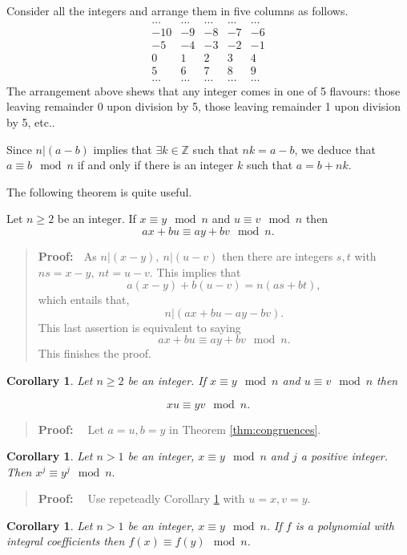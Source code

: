 \documentclass[11pt, openany]{book}
\theoremstyle{change} \theoremheaderfont{\blue\sffamily\bfseries}
\newtheorem{cor}[thm]{Corollary}
\newcommand{\proofsymbol}{\Pisymbol{pzd}{113}}
\theoremstyle{nonumberplain} \theoremheaderfont{\sffamily\bfseries}
\newenvironment{pf}[0]{\itshape\begin{quote}{\bf Proof: \ }}{\proofsymbol\end{quote}}
\newcommand{\BBZ}{\mathbb{Z}}
\newcommand{\í}{\'{\i}}
\begin{document}
Consider all the integers and arrange them in five columns as
follows.
$$\begin{array}{ccccc}
\ldots & \ldots & \ldots & \ldots & \ldots \\
-10 & -9 & -8 & -7 & -6 \\
-5 & -4 & -3 & -2 & -1 \\
0 & 1 & 2 & 3 & 4 \\
5 & 6 & 7 & 8 & 9 \\
\ldots & \ldots & \ldots & \ldots & \ldots
\end{array}$$
The arrangement above shews that any integer comes in one of 5
flavours: those leaving remainder 0 upon division by 5, those
leaving remainder 1 upon division by 5, etc..





Since $n|(a - b)$ implies that $\exists k \in \BBZ$ such that $nk
= a - b$, we deduce that $a \equiv b \mod n$ if and only if there
is an integer $k$ such that $a = b + nk.$



The following theorem is quite useful.
\begin{thm} Let $n \geq 2$  be an integer. If $x \equiv y  \mod n$ and
$u \equiv v \mod n$ then
$$ax + bu \equiv ay + bv \mod n.$$
\label{thm:congruences}\end{thm}
\begin{pf}As $n|(x - y), \ n|(u - v)$ then there are integers $s, t$
with $ns = x - y, \ nt = u - v$. This implies that
$$a(x - y) + b(u - v) = n(as + bt),$$ which entails that,
$$n|(ax + bu - ay - bv).$$This last assertion is equivalent to saying
$$ax + bu \equiv ay + bv  \mod n.$$ This finishes the proof.
\end{pf}
\begin{cor} Let $n \geq 2$  be an integer. If $x \equiv y \mod n$ and
$u \equiv v \mod n$ then

$$xu \equiv  yv \mod n.$$
\label{cor:cong_1}\end{cor}
\begin{pf} Let $a = u, b = y$ in Theorem \ref{thm:congruences}.
\end{pf}
\begin{cor} Let $n > 1$ be an integer, $x \equiv y  \mod n$ and
$j$ a positive integer. Then $x^j \equiv y^j \mod  n.$
\label{cor:cong_2}\end{cor} \begin{pf}  Use repeteadly Corollary
\ref{cor:cong_1} with $u = x, v = y.$
\end{pf}
\begin{cor} Let $n > 1$ be an integer, $x \equiv y  \mod n$.
If $f$ is a polynomial with integral coefficients then $f(x)
\equiv f(y) \mod n$.
\end{cor}
\end{document}
